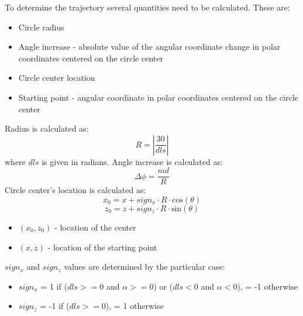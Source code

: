 \documentclass[english,10pt,a4paper]{article}
\begin{document}
	\newpage
	To determine the trajectory several quantities need to be calculated. These are:
	\begin{itemize}
		\item Circle radius
		\item Angle increase - absolute value of the angular coordinate change in polar coordinates centered on the circle center
		\item Circle center location
		\item Starting point - angular coordinate in polar coordinates centered on the circle center
	\end{itemize}
	Radius is calculated as:
	\begin{equation}
		R = \left|\frac{30} {dls}\right|
	\end{equation}
	where $dls$ is given in radians.\newline
	Angle increase is calculated as:
	\begin{equation}
		\Delta \phi = \frac{md}{R}
	\end{equation}
	Circle center's location is calculated as:
	\begin{equation}
		x_0 = x + sign_x \cdot R \cdot \mathrm{cos}(\theta)
	\end{equation}
	\begin{equation}
		z_0 = z + sign_z \cdot R \cdot \mathrm{sin}(\theta)
	\end{equation}
	\begin{itemize}
		\item $(x_0, z_0)$ - location of the center
		\item $(x, z)$ - location of the starting point
	\end{itemize}
	$sign_x$ and $sign_z$ values are determined by the particular case:

	\begin{itemize}
		\item $sign_x$ = 1 if ($dls >=0$ and $\alpha >= 0$) or ($dls < 0$ and $\alpha < 0$), = -1 otherwise
		\item $sign_z$ = -1 if ($dls >= 0$), = 1 otherwise
	\end{itemize}
\end{document}
